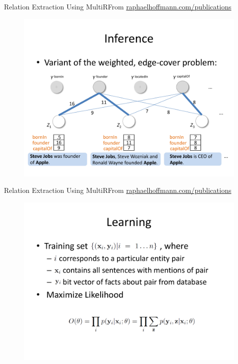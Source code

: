 \documentclass{beamer}
\begin{document}
\begin{frame}{Relation Extraction Using MultiR}{From \url{raphaelhoffmann.com/publications}}
\begin{figure}[h]
 \centering
 \includegraphics[scale=0.40]{./imgs/multirmode5.pdf}
 \end{figure}
\end{frame}
\begin{frame}{Relation Extraction Using MultiR}{From \url{raphaelhoffmann.com/publications}}
\begin{figure}[h]
 \centering
 \includegraphics[scale=0.40]{./imgs/multirmode6.pdf}
 \end{figure}
\end{frame}
\end{document}
